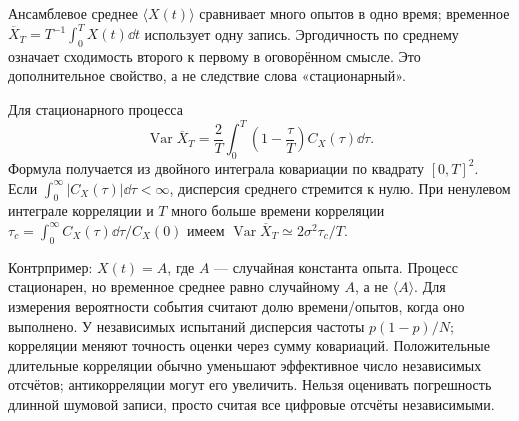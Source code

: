 
Ансамблевое среднее $\langle X(t)\rangle$ сравнивает много опытов в одно время; временное $\overline X_T=T^{-1}\int_0^TX(t)\dd t$ использует одну запись. Эргодичность по среднему означает сходимость второго к первому в оговорённом смысле. Это дополнительное свойство, а не следствие слова «стационарный».

Для стационарного процесса
\begin{equation}
 \operatorname{Var}\overline X_T=\frac{2}{T}\int_0^T\left(1-\frac\tau T\right)C_X(\tau)\dd\tau.
\end{equation}
Формула получается из двойного интеграла ковариации по квадрату $[0,T]^2$. Если $\int_0^\infty|C_X(\tau)|\dd\tau<\infty$, дисперсия среднего стремится к нулю. При ненулевом интеграле корреляции и $T$ много больше времени корреляции $\tau_c=\int_0^\infty C_X(\tau)\dd\tau/C_X(0)$ имеем $\operatorname{Var}\overline X_T\simeq2\sigma^2\tau_c/T$.

Контрпример: $X(t)=A$, где $A$ — случайная константа опыта. Процесс стационарен, но временное среднее равно случайному $A$, а не $\langle A\rangle$. Для измерения вероятности события считают долю времени/опытов, когда оно выполнено. У независимых испытаний дисперсия частоты $p(1-p)/N$; корреляции меняют точность оценки через сумму ковариаций. Положительные длительные корреляции обычно уменьшают эффективное число независимых отсчётов; антикорреляции могут его увеличить. Нельзя оценивать погрешность длинной шумовой записи, просто считая все цифровые отсчёты независимыми.
